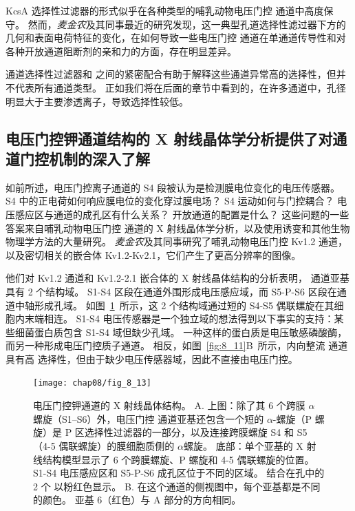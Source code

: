 KcsA 选择性过滤器的形式似乎在各种类型的哺乳动物电压门控  通道中高度保守。
然而，\textit{麦金农}及其同事最近的研究发现，这一典型孔道选择性滤过器下方的几何和表面电荷特征的变化，在如何导致一些电压门控  通道在单通道传导性和对各种开放通道阻断剂的亲和力的方面，存在明显差异。


 通道选择性过滤器和  之间的紧密配合有助于解释这些通道异常高的选择性，但并不代表所有通道类型。
正如我们将在后面的章节中看到的，在许多通道中，孔径明显大于主要渗透离子，导致选择性较低。



\subsection{电压门控钾通道结构的 X 射线晶体学分析提供了对通道门控机制的深入了解}

如前所述，电压门控离子通道的 S4 段被认为是检测膜电位变化的电压传感器。
S4 中的正电荷如何响应膜电位的变化穿过膜电场？
S4 运动如何与门控耦合？
电压感应区与通道的成孔区有什么关系？
开放通道的配置是什么？
这些问题的一些答案来自哺乳动物电压门控  通道的 X 射线晶体学分析，以及使用诱变和其他生物物理学方法的大量研究。
\textit{麦金农}及其同事研究了哺乳动物电压门控 Kv1.2  通道，以及密切相关的嵌合体 Kv1.2-Kv2.1，它们产生了更高分辨率的图像。


他们对 Kv1.2 通道和 Kv1.2-2.1 嵌合体的 X 射线晶体结构的分析表明， 通道亚基具有 2 个结构域。
S1-S4 区段在通道外围形成电压感应域，而 S5-P-S6 区段在通道中轴形成孔域。
如图~\ref{fig:8_13}~所示，这 2 个结构域通过短的 S4-S5 偶联螺旋在其细胞内末端相连。
S1-S4 电压传感器是一个独立域的想法得到以下事实的支持：某些细菌蛋白质包含 S1-S4 域但缺少孔域。
一种这样的蛋白质是电压敏感磷酸酶，而另一种形成电压门控质子通道。
相反，如图~\ref{fig:8_11}B~所示，内向整流  通道具有高  选择性，但由于缺少电压传感器域，因此不直接由电压门控。


\begin{figure}[htbp]
	\centering
	\texttt{[image: chap08/fig\_8\_13]}
	\caption{电压门控钾通道的 X 射线晶体结构\cite{long2007atomic}。
		A. 上图：除了其 6 个跨膜 $\alpha$ 螺旋（S1–S6）外，电压门控  通道亚基还包含一个短的 $\alpha$-螺旋（P 螺旋）是 P 区选择性过滤器的一部分，以及连接跨膜螺旋 S4 和 S5（4-5 偶联螺旋）的膜细胞质侧的 $\alpha$螺旋。
		底部：单个亚基的 X 射线结构模型显示了 6 个跨膜螺旋、P 螺旋和 4-5 偶联螺旋的位置。
		S1-S4 电压感应区和 S5-P-S6 成孔区位于不同的区域。
		结合在孔中的 2 个  以粉红色显示。
		B. 在这个通道的侧视图中，每个亚基都是不同的颜色。
		亚基 6（红色）与 A 部分的方向相同。}
	\label{fig:8_13}
\end{figure}


